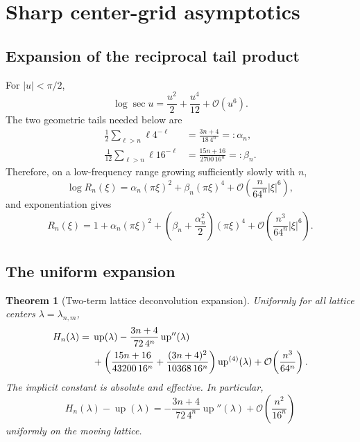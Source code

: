 \documentclass[11pt,oneside]{article}
\newtheorem{theorem}{Theorem}[section]
\theoremstyle{definition}
\theoremstyle{remark}
\newcommand{\Up}{\operatorname{up}}
\newcommand{\bigO}{\mathcal O}
\begin{document}
\section{Sharp center-grid asymptotics}
\label{tmrates:sec:center-rate}

\subsection{Expansion of the reciprocal tail product}

For $|u|<\pi/2$,
\begin{equation}
 \log\sec u=\frac{u^2}{2}+\frac{u^4}{12}+\bigO(u^6).       \label{tmrates:eq:logsec}
\end{equation}
The two geometric tails needed below are
\begin{align}
 \frac12\sum_{\ell>n}\ell4^{-\ell}
 &=\frac{3n+4}{18\,4^n}=:\alpha_n,                        \label{tmrates:eq:alpha-n}\\
 \frac1{12}\sum_{\ell>n}\ell16^{-\ell}
 &=\frac{15n+16}{2700\,16^n}=: \beta_n.                  \label{tmrates:eq:beta-n}
\end{align}
Therefore, on a low-frequency range growing sufficiently slowly with $n$,
\begin{equation}
 \log R_n(\xi)
 =\alpha_n(\pi\xi)^2+\beta_n(\pi\xi)^4
  +\bigO\!\left(\frac{n}{64^n}|\xi|^6\right),            \label{tmrates:eq:log-Rn}
\end{equation}
and exponentiation gives
\begin{equation}
 R_n(\xi)=1+\alpha_n(\pi\xi)^2
 +\left(\beta_n+\frac{\alpha_n^2}{2}\right)(\pi\xi)^4
 +\bigO\!\left(\frac{n^3}{64^n}|\xi|^6\right).          \label{tmrates:eq:Rn-expansion}
\end{equation}

\subsection{The uniform expansion}

\begin{theorem}[Two-term lattice deconvolution expansion]
\label{tmrates:thm:center-expansion}
Uniformly for all lattice centers $\lambda=\lambda_{n,m}$,
\begin{align}
 H_n(\lambda)
={}&\Up(\lambda)
 -\frac{3n+4}{72\,4^n}\Up''(\lambda) \notag\\
 &+\left(
   \frac{15n+16}{43200\,16^n}
  +\frac{(3n+4)^2}{10368\,16^n}
  \right)\Up^{(4)}(\lambda)
 +\bigO\!\left(\frac{n^3}{64^n}\right).                 \label{tmrates:eq:center-expansion}
\end{align}
The implicit constant is absolute and effective.  In particular,
\begin{equation}
 H_n(\lambda)-\Up(\lambda)
 =-\frac{3n+4}{72\,4^n}\Up''(\lambda)
  +\bigO\!\left(\frac{n^2}{16^n}\right)                 \label{tmrates:eq:center-leading}
\end{equation}
uniformly on the moving lattice.
\end{theorem}
\end{document}

